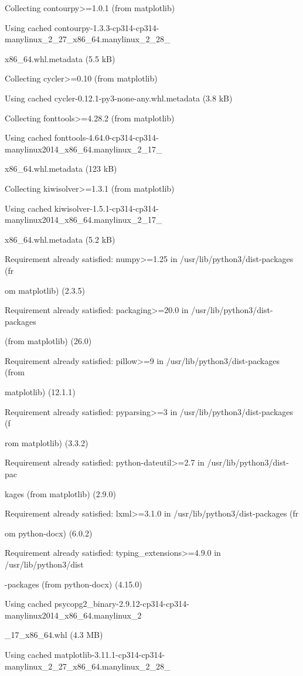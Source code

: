 \documentclass[11pt,a4paper]{article}
\begin{document}
Collecting contourpy>=1.0.1 (from matplotlib)

Using cached contourpy-1.3.3-cp314-cp314-manylinux\_2\_27\_x86\_64.manylinux\_2\_28\_

x86\_64.whl.metadata (5.5 kB)

Collecting cycler>=0.10 (from matplotlib)

Using cached cycler-0.12.1-py3-none-any.whl.metadata (3.8 kB)

Collecting fonttools>=4.28.2 (from matplotlib)

Using cached fonttools-4.64.0-cp314-cp314-manylinux2014\_x86\_64.manylinux\_2\_17\_

x86\_64.whl.metadata (123 kB)

Collecting kiwisolver>=1.3.1 (from matplotlib)

Using cached kiwisolver-1.5.1-cp314-cp314-manylinux2014\_x86\_64.manylinux\_2\_17\_

x86\_64.whl.metadata (5.2 kB)

Requirement already satisfied: numpy>=1.25 in /usr/lib/python3/dist-packages (fr

om matplotlib) (2.3.5)

Requirement already satisfied: packaging>=20.0 in /usr/lib/python3/dist-packages

(from matplotlib) (26.0)

Requirement already satisfied: pillow>=9 in /usr/lib/python3/dist-packages (from

matplotlib) (12.1.1)

Requirement already satisfied: pyparsing>=3 in /usr/lib/python3/dist-packages (f

rom matplotlib) (3.3.2)

Requirement already satisfied: python-dateutil>=2.7 in /usr/lib/python3/dist-pac

kages (from matplotlib) (2.9.0)

Requirement already satisfied: lxml>=3.1.0 in /usr/lib/python3/dist-packages (fr

om python-docx) (6.0.2)

Requirement already satisfied: typing\_extensions>=4.9.0 in /usr/lib/python3/dist

-packages (from python-docx) (4.15.0)

Using cached psycopg2\_binary-2.9.12-cp314-cp314-manylinux2014\_x86\_64.manylinux\_2

\_17\_x86\_64.whl (4.3 MB)

Using cached matplotlib-3.11.1-cp314-cp314-manylinux\_2\_27\_x86\_64.manylinux\_2\_28\_
\end{document}
